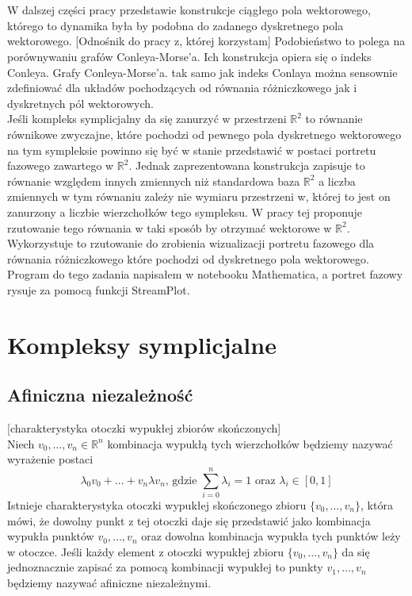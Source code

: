 \documentclass[12pt,a4paper]{article}
\newcommand{\Rn}[0]{\mathbb{R}^n}
\newcommand{\set}[1]{ \{#1\}}
\begin{document}
\\
\\W dalszej części pracy przedstawie konstrukcje ciągłego pola wektorowego, którego to dynamika była by podobna do zadanego dyskretnego pola wektorowego. [Odnośnik do pracy z, której korzystam]
Podobieństwo to polega na porównywaniu grafów Conleya-Morse’a. Ich konstrukcja opiera się o indeks Conleya. Grafy Conleya-Morse’a. tak samo jak indeks Conlaya można sensownie zdefiniować dla układów pochodzących od równania różniczkowego jak i dyskretnych pól wektorowych.
\\
\noindent
Jeśli kompleks symplicjalny da się zanurzyć w przestrzeni $\mathbb{R}^2$ to równanie równikowe zwyczajne, które pochodzi od pewnego pola dyskretnego wektorowego na tym sympleksie powinno się być w stanie przedstawić w postaci portretu fazowego zawartego w $\mathbb{R}^2$. Jednak zaprezentowana konstrukcja zapisuje to równanie względem innych zmiennych niż standardowa baza $\mathbb{R}^2$ a liczba zmiennych w tym równaniu zależy nie wymiaru przestrzeni w, której to jest on zanurzony a liczbie wierzchołków tego sympleksu. W pracy tej proponuje rzutowanie tego równania w taki sposób by otrzymać wektorowe w $\mathbb{R}^2$. Wykorzystuje to rzutowanie do zrobienia wizualizacji portretu fazowego dla równania różniczkowego które pochodzi od dyskretnego pola wektorowego. Program do tego zadania napisałem w notebooku Mathematica, a portret fazowy rysuje za pomocą funkcji StreamPlot.
\\



\section{Kompleksy symplicjalne}

\subsection{Afiniczna niezależność}
[charakterystyka otoczki wypukłej zbiorów skończonych]
\\
\noindent
Niech $v_0,\ldots,v_n\in\Rn$ kombinacja wypukłą tych wierzchołków będziemy nazywać wyrażenie postaci
$$\lambda_0v_0 + \dots + v_n\lambda v_n\text{, gdzie }\sum_{i=0}^n\lambda_i=1 \text{ oraz }\lambda_i\in[0,1]$$
Istnieje charakterystyka otoczki wypukłej skończonego zbioru $\set{v_0,\ldots,v_n}$, która mówi, że dowolny punkt z tej otoczki daje się przedstawić jako kombinacja wypukła punktów $v_0,\ldots, v_n$ oraz dowolna kombinacja wypukła tych punktów leży w otoczce. 
Jeśli każdy element z otoczki wypukłej zbioru $\set{v_0,\ldots,v_n}$ da się jednoznacznie zapisać za pomocą kombinacji wypukłej to punkty $v_1,\ldots ,v_n$ będziemy nazywać afiniczne niezależnymi.
\end{document}
